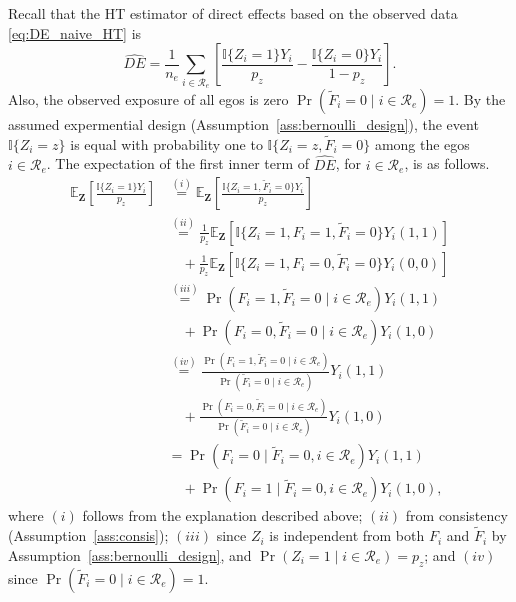 \documentclass[11pt]{article}
\theoremstyle{definition}
\def \bZ {\boldsymbol{Z}}
\def \cR {\mathcal{R}}
\def \EX {\mathbb{E}}
\begin{document}
Recall that the HT estimator of direct effects based on the observed data \eqref{eq:DE_naive_HT} is
\begin{equation*}
    \widehat{DE} = 
    \frac{1}{n_e}
    \sum_{i \in \cR_e}
    \left[
    \frac{
    \mathbb{I}\{Z_i=1\}Y_i}{p_z} 
    -
    \frac{
    \mathbb{I}\{Z_i=0\}Y_i}{1 - p_z} 
    \right].
\end{equation*}
Also, the observed exposure of all egos is zero $\Pr(\widetilde{F}_i =0 \mid i \in \cR_e) =1$. By the assumed expermential design (Assumption~\ref{ass:bernoulli_design}), the event $\mathbb{I}\{Z_i=z\}$ is equal with probability one to $\mathbb{I}\{Z_i=z, \widetilde{F}_i =0\}$ among the egos $i \in \cR_e$.
The expectation of the first inner term of $\widehat{DE}$, for $i \in \cR_e$, is as follows.
\begin{equation*}
    \begin{aligned}        
    \EX_{\bZ}\left[\frac{
    \mathbb{I}\{Z_i=1\}Y_i}{p_z} \right]
    &\overset{(i)}{=}
    \EX_{\bZ}\left[\frac{
    \mathbb{I}\{Z_i=1, \widetilde{F}_i =0\}Y_i}{p_z} \right]
    \\ &\overset{(ii)}{=}
     \frac{1}{p_z}
     \EX_{\bZ}
     \left[
    \mathbb{I}\{Z_i=1,F_i=1,\widetilde{F}_i=0\}Y_i(1,1) 
    \right]
    \\ &\quad +
    \frac{1}{p_z}
     \EX_{\bZ}
     \left[
    \mathbb{I}\{Z_i=1,F_i=0,\widetilde{F}_i=0\}Y_i(0,0) 
    \right]
    \\ &\overset{(iii)}{=}
    \Pr(F_i=1, \widetilde{F}_i=0 \mid i \in \cR_e)Y_i(1,1)
    \\ &\quad + 
    \Pr(F_i=0, \widetilde{F}_i=0 \mid i \in \cR_e)Y_i(1,0)
    \\ &\overset{(iv)}{=}
     \frac{\Pr(F_i=1, \widetilde{F}_i=0 \mid i \in \cR_e)}{\Pr(\widetilde{F}_i=0 \mid i\in \cR_e)}Y_i(1,1)
    \\ &\quad + 
    \frac{\Pr(F_i=0, \widetilde{F}_i=0 \mid i \in \cR_e)}{\Pr(\widetilde{F}_i=0 \mid i\in \cR_e)}
    Y_i(1,0)
    \\ &=
    \Pr(F_i=0 \mid \widetilde{F}_i=0, i \in \cR_e)
    Y_i(1,1)
    \\ &\quad +
    \Pr(F_i=1 \mid \widetilde{F}_i=0, i \in \cR_e)
    Y_i(1,0),
    \end{aligned}
\end{equation*}
where $(i)$ follows from the explanation described above; $(ii)$ from consistency (Assumption~\ref{ass:consis});
$(iii)$ since $Z_i$ is independent from both $F_i$ and $\widetilde{F}_i$ by Assumption~\ref{ass:bernoulli_design}, and $\Pr(Z_i=1\mid i \in \cR_e)=p_z$; and $(iv)$ since $\Pr(\widetilde{F}_i=0 \mid i\in \cR_e)=1$.
\end{document}
